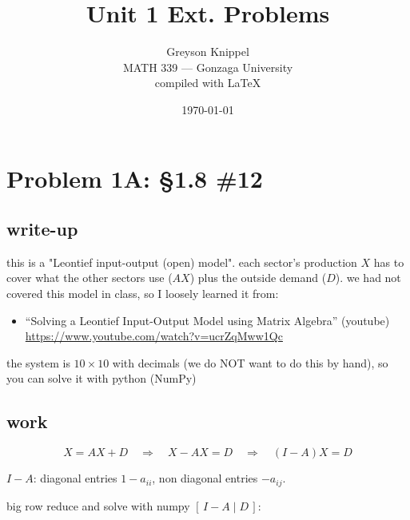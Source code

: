 \documentclass{article}
\title{Unit 1 Ext. Problems}
\author{
Greyson Knippel \\[4pt]
MATH 339 --- Gonzaga University \\[4pt]
compiled with \LaTeX{}
}
\date{\today}
\begin{document}
\maketitle

\begin{center}
\end{center}

\section*{Problem 1A: \S1.8 \#12}

\subsection*{write-up}

this is a "Leontief input-output (open) model".
each sector's production $X$ has to cover what the other sectors use ($AX$)
plus the outside demand ($D$).
we had not covered this model in class, so I loosely learned it from:

\begin{itemize}
  \item ``Solving a Leontief Input-Output Model using Matrix Algebra'' (youtube) \\
        \url{https://www.youtube.com/watch?v=ucrZqMww1Qc}
\end{itemize}

the system is $10 \times 10$ with decimals (we do NOT want to do this by hand), so you can solve it with python (NumPy)

\subsection*{work}

\[
X = AX + D
\quad\Rightarrow\quad
X - AX = D
\quad\Rightarrow\quad
(I - A)X = D
\]

$I - A$: diagonal entries $1 - a_{ii}$, non diagonal entries $-a_{ij}$.

big row reduce and solve with numpy $[\,I - A \mid D\,]$:
\end{document}
